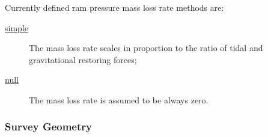 Currently defined ram pressure mass loss rate methods are:
\begin{description}
 \item [\hyperlink{tidal_stripping.mass_loss_rate.disks.simple.F90:tidal_stripping_mass_loss_rate_disks_simple:tidal_stripping_mass_loss_rate_disk_simple}{{\normalfont \ttfamily simple}}] The mass loss rate scales in proportion to the ratio of tidal and gravitational restoring forces;
 \item [\hyperlink{tidal_stripping.mass_loss_rate.disks.null.F90:tidal_stripping_mass_loss_rate_disks_null:tidal_stripping_mass_loss_rate_disk_null}{{\normalfont \ttfamily null}}] The mass loss rate is assumed to be always zero.
\end{description}


\subsubsection{Survey Geometry}

